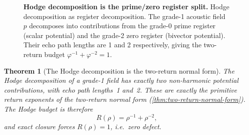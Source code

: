 \documentclass[11pt,a4paper]{article}
\theoremstyle{plain}
\newtheorem{theorem}{Theorem}[section]
\theoremstyle{definition}
\theoremstyle{remark}
\numberwithin{equation}{section}
\begin{document}
\begin{figure}[ht]
\centering
{}
\caption{\textbf{Hodge decomposition is the prime/zero register split.}
Hodge decomposition as register decomposition.  The grade-1
acoustic field \(p\) decomposes into contributions from the grade-0
prime register (scalar potential) and the grade-2 zero register
(bivector potential).  Their echo path lengths are 1 and 2
respectively, giving the two-return budget
\(\varphi^{-1}+\varphi^{-2}=1\).}
\label{fig:hodge-registers}
\end{figure}

\begin{theorem}[The Hodge decomposition is the two-return normal form]
\label{thm:hodge-two-return}
The Hodge decomposition of a grade-1 field has exactly two non-harmonic
potential contributions, with echo path lengths~1 and~2.  These are
exactly the primitive return exponents of the two-return normal form
(\cref{thm:two-return-normal-form}).  The Hodge budget is therefore
\[
  R(\rho)=\rho^{-1}+\rho^{-2},
\]
and exact closure forces \(R(\rho)=1\), i.e.\ zero defect.
\end{theorem}
\end{document}
